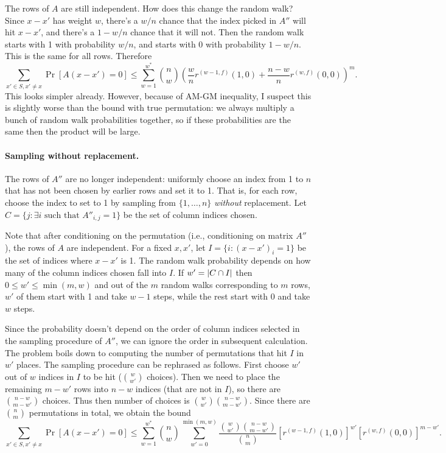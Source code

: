 \documentclass[11pt]{article}
\begin{document}
The rows of $A$ are still independent.
How does this change the random walk?
Since $x - x'$ has weight $w$, there's a $w/n$ chance that the index picked in
$A''$ will hit $x - x'$, and there's a $1 - w/n$ chance that it will not.
Then the random walk starts with 1 with probability $w/n$, and starts with 0
with probability $1-w/n$.
This is the same for all rows.
Therefore
\begin{equation*}
  \sum_{x' \in S, x' \neq x} \Pr[A(x - x') = 0] \leq \sum_{w=1}^{w^*} \binom{n}{w} \left(
    \frac{w}{n} r^{(w-1, f)}(1, 0) + \frac{n-w}{n} r^{(w, f)}(0, 0)\right)^m. 
\end{equation*}
This looks simpler already.
However, because of AM-GM inequality, I suspect this is slightly worse than the
bound with true permutation: we always multiply a bunch of random walk
probabilities together, so if these probabilities are the same then the product
will be large.

\paragraph{Sampling without replacement.}
The rows of $A''$ are no longer independent: uniformly choose an index from 1 to
$n$ that has not been chosen by earlier rows and set it to 1.
That is, for each row, choose the index to set to 1 by sampling from $\{ 1,
\dots, n \}$ \emph{without} replacement.
Let $C = \{ j \colon \exists i \text{ such that } A''_{i, j} = 1 \}$ be the set of
column indices chosen.

Note that after conditioning on the permutation (i.e., conditioning on matrix
$A''$), the rows of $A$ are independent.
For a fixed $x, x'$, let $I = \{ i \colon (x - x')_i = 1 \}$ be the set of
indices where $x - x'$ is 1.
The random walk probability depends on how many of the column indices chosen
fall into $I$.
If $w' = \left\lvert C \cap I\right\rvert$ then $0 \leq w' \leq \min(m, w)$ and out of the $m$ random walks
corresponding to $m$ rows, $w'$ of them start with 1 and take $w - 1$ steps,
while the rest start with 0 and take $w$ steps.

Since the probability doesn't depend on the order of column indices selected in
the sampling procedure of $A''$, we can ignore the order in subsequent
calculation.
The problem boils down to computing the number of permutations that hit $I$ in
$w'$ places.
The sampling procedure can be rephrased as follows. 
First choose $w'$ out of $w$ indices in $I$ to be hit ($\binom{w}{w'}$ choices).
Then we need to place the remaining $m - w'$ rows into $n - w$ indices (that are
not in $I$), so there are $\binom{n - w}{m - w'}$ choices.
Thus then number of choices is $\binom{w}{w'} \binom{n - w}{m - w'}$.
Since there are $\binom{n}{m}$ permutations in total, we obtain the bound
\begin{equation*}
  \sum_{x' \in S, x' \neq x} \Pr[A(x - x') = 0] \leq \sum_{w=1}^{w^*} \binom{n}{w}
  \sum_{w'=0}^{\min(m, w)}\frac{\binom{w}{w'} \binom{n - w}{m - w'}}{\binom{n}{m}}
  [r^{(w-1, f)}(1, 0)]^{w'} [r^{(w, f)}(0, 0)]^{m-w'}.  
\end{equation*}
\end{document}
